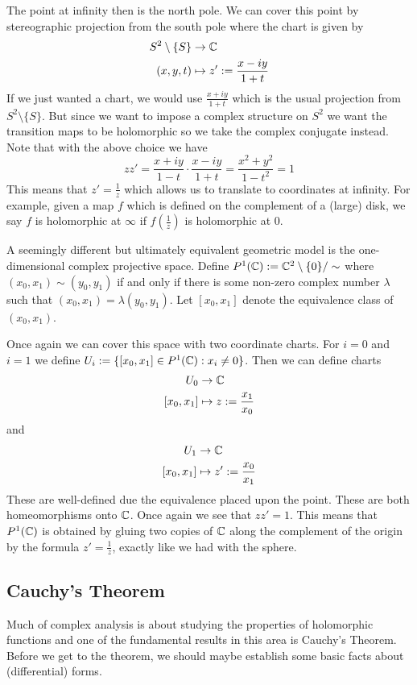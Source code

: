 The point at infinity then is the north pole. We can cover this point by stereographic projection from the south pole where the chart is given by
\begin{align*}
    S^2 \setminus \{S\} &\to \mathbb{C}\\
    (x, y, t) &\mapsto z' := \frac{x - iy}{1 + t}
\end{align*}
If we just wanted a chart, we would use $\frac{x + iy}{1 + t}$ which is the usual projection from $S^2\setminus \{S\}$. But since we want to impose a complex structure on $S^2$ we want the transition maps to be holomorphic so we take the complex conjugate instead. Note that with the above choice we have
$$zz' = \frac{x + iy}{1 - t} \cdot \frac{x - iy}{1 + t} = \frac{x^2 + y^2}{1 - t^2} = 1$$
This means that $z' = \frac{1}{z}$ which allows us to translate to coordinates at infinity. For example, given a map $f$ which is defined on the complement of a (large) disk, we say $f$ is holomorphic at $\infty$ if $f(\frac{1}{z})$ is holomorphic at $0$.

A seemingly different but ultimately equivalent geometric model is the one-dimensional complex projective space. Define $P^1(\mathbb{C}) := \mathbb{C}^2 \setminus \{0\}/\sim$ where $(x_0, x_1) \sim (y_0, y_1)$ if and only if there is some non-zero complex number $\lambda$ such that $(x_0, x_1) = \lambda (y_0, y_1)$. Let $[x_0, x_1]$ denote the equivalence class of $(x_0, x_1)$.

Once again we can cover this space with two coordinate charts. For $i = 0$ and $i = 1$ we define $U_i := \{[x_0, x_1] \in P^1(\mathbb{C}) : x_i \neq 0\}$. Then we can define charts
\begin{align*}
    U_0 &\to \mathbb{C}\\
    [x_0, x_1] &\mapsto z := \frac{x_1}{x_0}
\end{align*}
and
\begin{align*}
    U_1 &\to \mathbb{C}\\
    [x_0, x_1] &\mapsto z' := \frac{x_0}{x_1}
\end{align*}
These are well-defined due the equivalence placed upon the point. These are both homeomorphisms onto $\mathbb{C}$. Once again we see that $zz' = 1$. This means that $P^1(\mathbb{C})$ is obtained by gluing two copies of $\mathbb{C}$ along the complement of the origin by the formula $z' = \frac{1}{z}$, exactly like we had with the sphere.

\subsection{Cauchy's Theorem}
Much of complex analysis is about studying the properties of holomorphic functions and one of the fundamental results in this area is Cauchy's Theorem. Before we get to the theorem, we should maybe establish some basic facts about (differential) forms.

